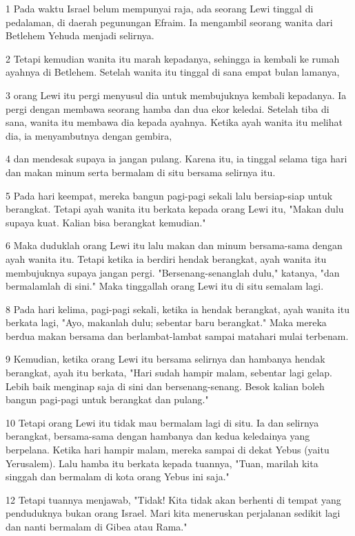\par 1 Pada waktu Israel belum mempunyai raja, ada seorang Lewi tinggal di pedalaman, di daerah pegunungan Efraim. Ia mengambil seorang wanita dari Betlehem Yehuda menjadi selirnya.
\par 2 Tetapi kemudian wanita itu marah kepadanya, sehingga ia kembali ke rumah ayahnya di Betlehem. Setelah wanita itu tinggal di sana empat bulan lamanya,
\par 3 orang Lewi itu pergi menyusul dia untuk membujuknya kembali kepadanya. Ia pergi dengan membawa seorang hamba dan dua ekor keledai. Setelah tiba di sana, wanita itu membawa dia kepada ayahnya. Ketika ayah wanita itu melihat dia, ia menyambutnya dengan gembira,
\par 4 dan mendesak supaya ia jangan pulang. Karena itu, ia tinggal selama tiga hari dan makan minum serta bermalam di situ bersama selirnya itu.
\par 5 Pada hari keempat, mereka bangun pagi-pagi sekali lalu bersiap-siap untuk berangkat. Tetapi ayah wanita itu berkata kepada orang Lewi itu, "Makan dulu supaya kuat. Kalian bisa berangkat kemudian."
\par 6 Maka duduklah orang Lewi itu lalu makan dan minum bersama-sama dengan ayah wanita itu. Tetapi ketika ia berdiri hendak berangkat, ayah wanita itu membujuknya supaya jangan pergi. "Bersenang-senanglah dulu," katanya, "dan bermalamlah di sini." Maka tinggallah orang Lewi itu di situ semalam lagi.
\par 8 Pada hari kelima, pagi-pagi sekali, ketika ia hendak berangkat, ayah wanita itu berkata lagi, "Ayo, makanlah dulu; sebentar baru berangkat." Maka mereka berdua makan bersama dan berlambat-lambat sampai matahari mulai terbenam.
\par 9 Kemudian, ketika orang Lewi itu bersama selirnya dan hambanya hendak berangkat, ayah itu berkata, "Hari sudah hampir malam, sebentar lagi gelap. Lebih baik menginap saja di sini dan bersenang-senang. Besok kalian boleh bangun pagi-pagi untuk berangkat dan pulang."
\par 10 Tetapi orang Lewi itu tidak mau bermalam lagi di situ. Ia dan selirnya berangkat, bersama-sama dengan hambanya dan kedua keledainya yang berpelana. Ketika hari hampir malam, mereka sampai di dekat Yebus (yaitu Yerusalem). Lalu hamba itu berkata kepada tuannya, "Tuan, marilah kita singgah dan bermalam di kota orang Yebus ini saja."
\par 12 Tetapi tuannya menjawab, "Tidak! Kita tidak akan berhenti di tempat yang penduduknya bukan orang Israel. Mari kita meneruskan perjalanan sedikit lagi dan nanti bermalam di Gibea atau Rama."

